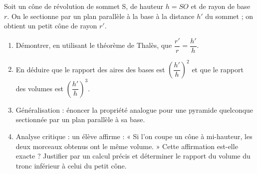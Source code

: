 \documentclass[11pt]{article}
\begin{document}
\begin{exercice}
Soit un cône de révolution de sommet S, de hauteur $h = SO$ et de rayon de base $r$. On le sectionne par un plan parallèle à la base à la distance $h'$ du sommet ; on obtient un petit cône de rayon $r'$.
\begin{enumerate}
\item Démontrer, en utilisant le théorème de Thalès, que $\dfrac{r'}{r} = \dfrac{h'}{h}$.
\item En déduire que le rapport des aires des bases est $\left(\dfrac{h'}{h}\right)^2$ et que le rapport des volumes est $\left(\dfrac{h'}{h}\right)^3$.
\item Généralisation : énoncer la propriété analogue pour une pyramide quelconque sectionnée par un plan parallèle à sa base.
\item Analyse critique : un élève affirme : « Si l'on coupe un cône à mi-hauteur, les deux morceaux obtenus ont le même volume. » Cette affirmation est-elle exacte ? Justifier par un calcul précis et déterminer le rapport du volume du tronc inférieur à celui du petit cône.
\end{enumerate}
\end{exercice}
\end{document}
